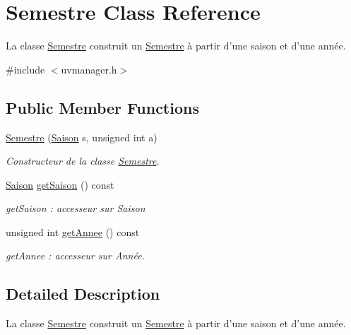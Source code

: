 \hypertarget{class_semestre}{\section{Semestre Class Reference}
\label{class_semestre}
}


La classe \hyperlink{class_semestre}{Semestre} construit un \hyperlink{class_semestre}{Semestre} à partir d'une saison et d'une année.  




{\ttfamily \#include $<$uvmanager.\+h$>$}

\subsection*{Public Member Functions}
\begin{DoxyCompactItemize}
\item 
\hyperlink{class_semestre_a4a0f1d3ab2f65755e0e0f610526522c2}{Semestre} (\hyperlink{uvmanager_8h_a72fcaae0ef529616dd62b747e259d545}{Saison} s, unsigned int a)
\begin{DoxyCompactList}\small\item\em Constructeur de la classe \hyperlink{class_semestre}{Semestre}. \end{DoxyCompactList}\item 
\hyperlink{uvmanager_8h_a72fcaae0ef529616dd62b747e259d545}{Saison} \hyperlink{class_semestre_a26e25575e7fb65649c47970a9800c3aa}{get\+Saison} () const 
\begin{DoxyCompactList}\small\item\em get\+Saison \+: accesseur sur Saison \end{DoxyCompactList}\item 
unsigned int \hyperlink{class_semestre_a5aa85395e97f58f491ebf251da8231ef}{get\+Annee} () const 
\begin{DoxyCompactList}\small\item\em get\+Annee \+: accesseur sur Année. \end{DoxyCompactList}\end{DoxyCompactItemize}


\subsection{Detailed Description}
La classe \hyperlink{class_semestre}{Semestre} construit un \hyperlink{class_semestre}{Semestre} à partir d'une saison et d'une année. 

